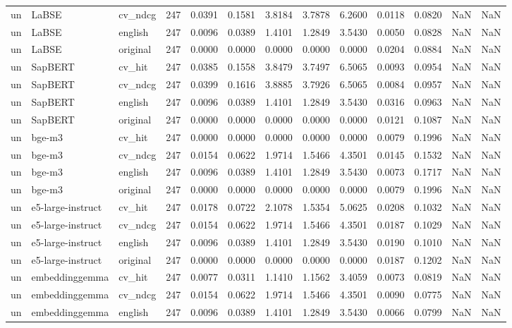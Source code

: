 \begin{tabular}{lllrrrrrrrrrr}
un & LaBSE & cv\_ndcg & 247 & 0.0391 & 0.1581 & 3.8184 & 3.7878 & 6.2600 & 0.0118 & 0.0820 & NaN & NaN \\
un & LaBSE & english & 247 & 0.0096 & 0.0389 & 1.4101 & 1.2849 & 3.5430 & 0.0050 & 0.0828 & NaN & NaN \\
un & LaBSE & original & 247 & 0.0000 & 0.0000 & 0.0000 & 0.0000 & 0.0000 & 0.0204 & 0.0884 & NaN & NaN \\
un & SapBERT & cv\_hit & 247 & 0.0385 & 0.1558 & 3.8479 & 3.7497 & 6.5065 & 0.0093 & 0.0954 & NaN & NaN \\
un & SapBERT & cv\_ndcg & 247 & 0.0399 & 0.1616 & 3.8885 & 3.7926 & 6.5065 & 0.0084 & 0.0957 & NaN & NaN \\
un & SapBERT & english & 247 & 0.0096 & 0.0389 & 1.4101 & 1.2849 & 3.5430 & 0.0316 & 0.0963 & NaN & NaN \\
un & SapBERT & original & 247 & 0.0000 & 0.0000 & 0.0000 & 0.0000 & 0.0000 & 0.0121 & 0.1087 & NaN & NaN \\
un & bge-m3 & cv\_hit & 247 & 0.0000 & 0.0000 & 0.0000 & 0.0000 & 0.0000 & 0.0079 & 0.1996 & NaN & NaN \\
un & bge-m3 & cv\_ndcg & 247 & 0.0154 & 0.0622 & 1.9714 & 1.5466 & 4.3501 & 0.0145 & 0.1532 & NaN & NaN \\
un & bge-m3 & english & 247 & 0.0096 & 0.0389 & 1.4101 & 1.2849 & 3.5430 & 0.0073 & 0.1717 & NaN & NaN \\
un & bge-m3 & original & 247 & 0.0000 & 0.0000 & 0.0000 & 0.0000 & 0.0000 & 0.0079 & 0.1996 & NaN & NaN \\
un & e5-large-instruct & cv\_hit & 247 & 0.0178 & 0.0722 & 2.1078 & 1.5354 & 5.0625 & 0.0208 & 0.1032 & NaN & NaN \\
un & e5-large-instruct & cv\_ndcg & 247 & 0.0154 & 0.0622 & 1.9714 & 1.5466 & 4.3501 & 0.0187 & 0.1029 & NaN & NaN \\
un & e5-large-instruct & english & 247 & 0.0096 & 0.0389 & 1.4101 & 1.2849 & 3.5430 & 0.0190 & 0.1010 & NaN & NaN \\
un & e5-large-instruct & original & 247 & 0.0000 & 0.0000 & 0.0000 & 0.0000 & 0.0000 & 0.0187 & 0.1202 & NaN & NaN \\
un & embeddinggemma & cv\_hit & 247 & 0.0077 & 0.0311 & 1.1410 & 1.1562 & 3.4059 & 0.0073 & 0.0819 & NaN & NaN \\
un & embeddinggemma & cv\_ndcg & 247 & 0.0154 & 0.0622 & 1.9714 & 1.5466 & 4.3501 & 0.0090 & 0.0775 & NaN & NaN \\
un & embeddinggemma & english & 247 & 0.0096 & 0.0389 & 1.4101 & 1.2849 & 3.5430 & 0.0066 & 0.0799 & NaN & NaN \\

\end{tabular}
